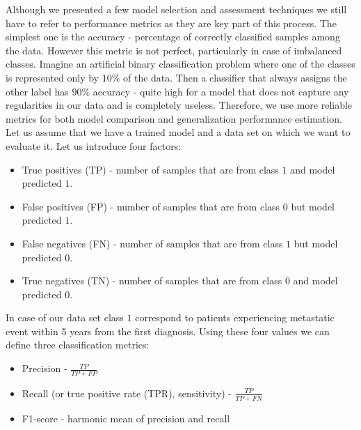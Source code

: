 \documentclass[shortabstract, english, mgr]{iithesis}
\begin{document}
Although we presented a few model selection and assessment techniques we still have to refer to performance metrics as they are key part of this process. The simplest one is the accuracy - percentage of correctly classified samples among the data. However this metric is not perfect, particularly in case of imbalanced classes. Imagine an artificial binary classification problem where one of the classes is represented only by $10\%$ of the data. Then a classifier that always assigns the other label has $90\%$ accuracy - quite high for a model that does not capture any regularities in our data and is completely useless. Therefore, we use more reliable metrics for both model comparison and generalization performance estimation. Let us assume that we have a trained model and a data set on which we want to evaluate it. Let us introduce four factors:
\begin{itemize}
    \item True positives (TP) - number of samples that are from class $1$ and model predicted $1$.
    \item False positives (FP) - number of samples that are from class $0$ but model predicted $1$.
    \item False negatives (FN) - number of samples that are from class $1$ but model predicted $0$.
    \item True negatives (TN) - number of samples that are from class $0$ and model predicted $0$. 
\end{itemize}
In case of our data set class $1$ correspond to patients experiencing metastatic event within 5 years from the first diagnosis. Using these four values we can define three classification metrics:
\begin{itemize}
    \item Precision - $\frac{TP}{TP + FP}$
    \item Recall (or true positive rate (TPR), sensitivity) - $\frac{TP}{TP + FN}$
    \item F1-score - harmonic mean of precision and recall
\end{itemize}
\end{document}
